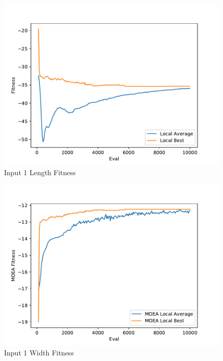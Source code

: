 \documentclass{standalone}
\begin{document}
\begin{figure}[!htb]
	\caption{Input 1 Length Fitness}
	\label{fig:graph_1006}
	\includegraphics[width=\textwidth]{../graphs/graphs/1006.pdf}
\end{figure}


\begin{figure}[!htb]
	\caption{Input 1 Width Fitness}
	\label{fig:graph_1006_moea}
	\includegraphics[width=\textwidth]{../graphs/graphs/1006_moea.pdf}
\end{figure}
\end{document}
